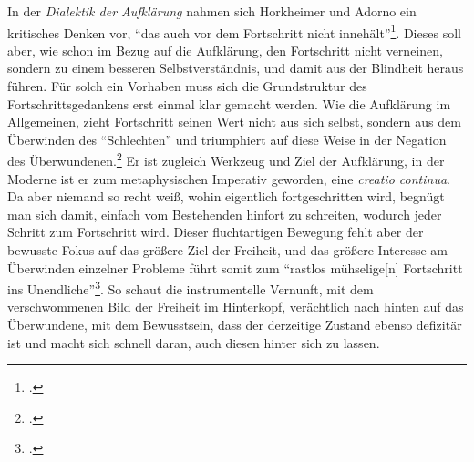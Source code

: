 \documentclass[a4paper, 12pt]{article}
\begin{document}
\begin{onehalfspace}
In der \emph{Dialektik der Aufklärung} nahmen sich Horkheimer und Adorno ein kritisches Denken vor, "`das auch vor dem Fortschritt nicht innehält"'\footnote{\Cite[Siehe][S. IX ("`Zur Neuausgabe"')]{dialektik-der-aufklaerung}.}. Dieses soll aber, wie schon im Bezug auf die Aufklärung, den Fortschritt nicht verneinen, sondern zu einem besseren Selbstverständnis, und damit aus der Blindheit heraus führen. Für solch ein Vorhaben muss sich die Grundstruktur des Fortschrittsgedankens erst einmal klar gemacht werden. Wie die Aufklärung im Allgemeinen, zieht Fortschritt seinen Wert nicht aus sich selbst, sondern aus dem Überwinden des "`Schlechten"' und triumphiert auf diese Weise in der Negation des Überwundenen.\footnote{\Cite[Vgl.][S. 638]{fortschritt}.} Er ist zugleich Werkzeug und Ziel der Aufklärung, in der Moderne ist er zum metaphysischen Imperativ geworden, eine \emph{creatio continua}. Da aber niemand so recht weiß, wohin eigentlich fortgeschritten wird, begnügt man sich damit, einfach vom Bestehenden hinfort zu schreiten, wodurch jeder Schritt zum Fortschritt wird. Dieser fluchtartigen Bewegung fehlt aber der bewusste Fokus auf das größere Ziel der Freiheit, und das größere Interesse am Überwinden einzelner Probleme führt somit zum "`rastlos mühselige[n] Fortschritt ins Unendliche"'\footnote{\Cite[Siehe][S. 32]{dialektik-der-aufklaerung}.}. So schaut die instrumentelle Vernunft, mit dem verschwommenen Bild der Freiheit im Hinterkopf, verächtlich nach hinten auf das Überwundene, mit dem Bewusstsein, dass der derzeitige Zustand ebenso defizitär ist und macht sich schnell daran, auch diesen hinter sich zu lassen. 


\end{onehalfspace}
\end{document}

